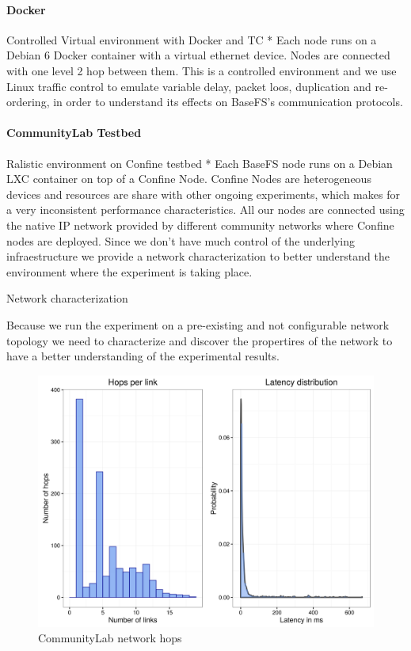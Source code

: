 \documentclass{sig-alternate}
\begin{document}
\paragraph{Docker}

Controlled Virtual environment with Docker and TC * Each node runs on a Debian 6 Docker container with a virtual ethernet device. Nodes are connected with one level 2 hop between them. This is a controlled environment and we use Linux traffic control to emulate variable delay, packet loos, duplication and re-ordering, in order to understand its effects on BaseFS's communication protocols.

\paragraph{CommunityLab Testbed}

Ralistic environment on Confine testbed * Each BaseFS node runs on a Debian LXC container on top of a Confine Node. Confine Nodes are heterogeneous devices and resources are share with other ongoing experiments, which makes for a very inconsistent performance characteristics. All our nodes are connected using the native IP network provided by different community networks where Confine nodes are deployed. Since we don't have much control of the underlying infraestructure we provide a network characterization to better understand the environment where the experiment is taking place.

Network characterization

Because we run the experiment on a pre-existing and not configurable network topology we need to characterize and discover the propertires of the network to have a better understanding of the experimental results.


\begin{figure}[htp]
\centering
\includegraphics[width=\columnwidth]{../eval/plots/characterization.png}
\caption{CommunityLab network hops}
\label{fig:characterization}
\end{figure}
\end{document}
